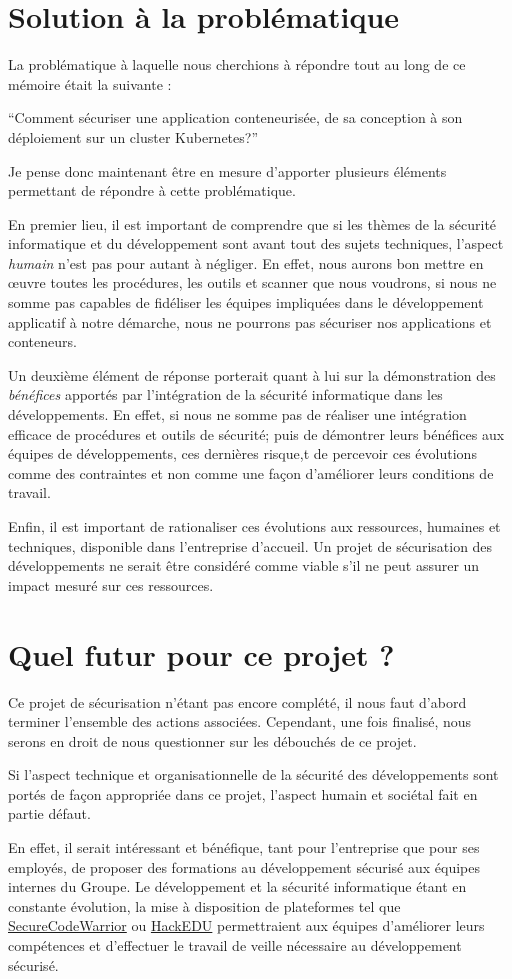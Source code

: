 \section{Solution à la problématique}
La problématique à laquelle nous cherchions à répondre tout au long de ce mémoire était la suivante : 
\begin{center}
    \color{bluejcd}  \enquote{Comment sécuriser une application conteneurisée, de sa conception à son déploiement sur un
     cluster Kubernetes?}
\end{center}
Je pense donc maintenant être en mesure d'apporter plusieurs éléments permettant de répondre à cette problématique.

En premier lieu, il est important de comprendre que si les thèmes de la sécurité informatique et du développement sont
avant tout des sujets techniques, l'aspect \emph{humain} n'est pas pour autant à négliger.
\newline En effet, nous aurons bon mettre en œuvre toutes les procédures, les outils et scanner que nous voudrons, si nous
ne somme pas capables de fidéliser les équipes impliquées dans le développement applicatif à notre démarche, nous ne 
pourrons pas sécuriser nos applications et conteneurs.

Un deuxième élément de réponse porterait quant à lui sur la démonstration des \emph{bénéfices} apportés par l'intégration
de la sécurité informatique dans les développements. En effet, si nous ne somme pas de réaliser une intégration efficace
de procédures et outils de sécurité; puis de démontrer leurs bénéfices aux équipes de développements, ces dernières risque,t
de percevoir ces évolutions comme des contraintes et non comme une façon d'améliorer leurs conditions de travail.

Enfin, il est important de rationaliser ces évolutions aux ressources, humaines et techniques, disponible dans l'entreprise
d'accueil. Un projet de sécurisation des développements ne serait être considéré comme viable s'il ne peut assurer un 
impact mesuré sur ces ressources.

\section{Quel futur pour ce projet ?}
Ce projet de sécurisation n'étant pas encore complété, il nous faut d'abord terminer l'ensemble des actions associées.
Cependant, une fois finalisé, nous serons en droit de nous questionner sur les débouchés de ce projet.

Si l'aspect technique et organisationnelle de la sécurité des développements sont portés de façon appropriée dans ce projet,
l'aspect humain et sociétal fait en partie défaut.

En effet, il serait intéressant et bénéfique, tant pour l'entreprise que pour ses employés, de proposer des formations
au développement sécurisé aux équipes internes du Groupe. Le développement et la sécurité informatique étant en constante
évolution, la mise à disposition de plateformes tel que \href{https://www.securecodewarrior.com/}{SecureCodeWarrior} ou 
\href{https://www.hackedu.com/}{HackEDU} permettraient aux équipes d'améliorer leurs compétences et d'effectuer le 
travail de veille nécessaire au développement sécurisé.